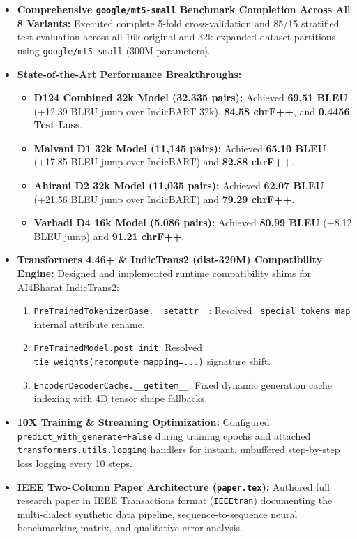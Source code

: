 \documentclass[10pt]{article}
\begin{document}
\begin{itemize}
  \item \textbf{Comprehensive \texttt{google/mt5-small} Benchmark Completion Across All 8 Variants:} Executed complete 5-fold cross-validation and 85/15 stratified test evaluation across all 16k original and 32k expanded dataset partitions using \texttt{google/mt5-small} (300M parameters).
  \item \textbf{State-of-the-Art Performance Breakthroughs:}
    \begin{itemize}
      \item \textbf{D124 Combined 32k Model (32,335 pairs):} Achieved \textbf{69.51 BLEU} (+12.39 BLEU jump over IndicBART 32k), \textbf{84.58 chrF++}, and \textbf{0.4456 Test Loss}.
      \item \textbf{Malvani D1 32k Model (11,145 pairs):} Achieved \textbf{65.10 BLEU} (+17.85 BLEU jump over IndicBART) and \textbf{82.88 chrF++}.
      \item \textbf{Ahirani D2 32k Model (11,035 pairs):} Achieved \textbf{62.07 BLEU} (+21.56 BLEU jump over IndicBART) and \textbf{79.29 chrF++}.
      \item \textbf{Varhadi D4 16k Model (5,086 pairs):} Achieved \textbf{80.99 BLEU} (+8.12 BLEU jump) and \textbf{91.21 chrF++}.
    \end{itemize}
  \item \textbf{Transformers 4.46+ \& IndicTrans2 (dist-320M) Compatibility Engine:} Designed and implemented runtime compatibility shims for AI4Bharat IndicTrans2:
    \begin{enumerate}
      \item \texttt{PreTrainedTokenizerBase.\_\_setattr\_\_}: Resolved \texttt{\_special\_tokens\_map} internal attribute rename.
      \item \texttt{PreTrainedModel.post\_init}: Resolved \texttt{tie\_weights(recompute\_mapping=...)} signature shift.
      \item \texttt{EncoderDecoderCache.\_\_getitem\_\_}: Fixed dynamic generation cache indexing with 4D tensor shape fallbacks.
    \end{enumerate}
  \item \textbf{10X Training \& Streaming Optimization:} Configured \texttt{predict\_with\_generate=False} during training epochs and attached \texttt{transformers.utils.logging} handlers for instant, unbuffered step-by-step loss logging every 10 steps.
  \item \textbf{IEEE Two-Column Paper Architecture (\texttt{paper.tex}):} Authored full research paper in IEEE Transactions format (\texttt{IEEEtran}) documenting the multi-dialect synthetic data pipeline, sequence-to-sequence neural benchmarking matrix, and qualitative error analysis.
\end{itemize}
\end{document}
